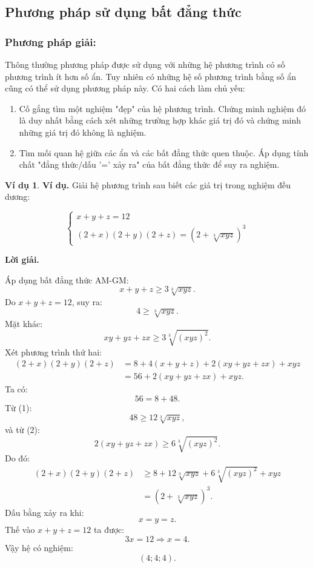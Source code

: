 \documentclass[12pt,a4paper,oneside]{book}
\theoremstyle{theorem}
\theoremstyle{definition}
\newtheorem{vd}[theorem2]{Ví dụ}
\begin{document}
    \subsection{Phương pháp sử dụng bất đẳng thức} 
    \subsubsection{Phương pháp giải:}
    Thông thường phương pháp được sử dụng với những hệ phương trình có số phương trình ít hơn số ẩn. Tuy nhiên có những hệ số phương trình bằng số ẩn cũng có thể sử dụng phương pháp này. Có hai cách làm chủ yếu:
    \begin{enumerate}
        \item  Cố gắng tìm một nghiệm "đẹp" của hệ phương trình. Chứng minh nghiệm đó là duy nhất bằng cách xét những trường hợp khác giá trị đó và chứng minh những giá trị đó không là nghiệm. 
        \item Tìm mối quan hệ giữa các ẩn và các bất đẳng thức quen thuộc. Áp dụng tính chất "đẳng thức/dấu '=' xảy ra" của bất đẳng thức để suy ra nghiệm.
    \end{enumerate}


\begin{vd}
    \textbf{Ví dụ.} Giải hệ phương trình sau biết các giá trị trong nghiệm đều dương:

\[
\begin{cases}
x+y+z=12\\
(2+x)(2+y)(2+z)=\left(2+\sqrt[3]{xyz}\right)^3
\end{cases}
\]

\textbf{Lời giải.}

Áp dụng bất đẳng thức AM-GM:
\[x+y+z\ge 3\sqrt[3]{xyz}.\]
Do \(x+y+z=12\), suy ra:
\[4\ge \sqrt[3]{xyz}. \tag{1}
\]
Mặt khác:
\[xy+yz+zx\ge 3\sqrt[3]{(xyz)^2}. \tag{2}
\]
Xét phương trình thứ hai:
\begin{align*}
(2+x)(2+y)(2+z)
&=8+4(x+y+z)+2(xy+yz+zx)+xyz\\
&=56+2(xy+yz+zx)+xyz.
\end{align*}
Ta có:
\[
56=8+48.
\]
Từ (1):
\[48\ge 12\sqrt[3]{xyz},
\]
và từ (2):
\[2(xy+yz+zx)\ge 6\sqrt[3]{(xyz)^2}.
\]
Do đó:
\begin{align*}
(2+x)(2+y)(2+z)
&\ge 8+12\sqrt[3]{xyz}
+6\sqrt[3]{(xyz)^2}+xyz\\
&=\left(2+\sqrt[3]{xyz}\right)^3.
\end{align*}
Dấu bằng xảy ra khi:
\[x=y=z.
\]
Thế vào \(x+y+z=12\) ta được:
\[3x=12\Rightarrow x=4.
\]
Vậy hệ có nghiệm:
\[
\boxed{(4;4;4)}.
\]
\end{vd}
   
\end{document}
